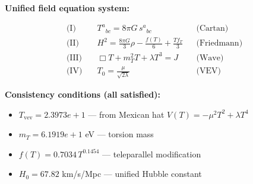 
\textbf{Unified field equation system:}

\begin{align}
  \text{(I)} \quad & T^a{}_{bc} = 8\pi G \, s^a{}_{bc} && \text{(Cartan)} \\
  \text{(II)} \quad & H^2 = \frac{8\pi G}{3}\rho - \frac{f(T)}{6} + \frac{Tf_T}{3} && \text{(Friedmann)} \\
  \text{(III)} \quad & \Box T + m_T^2 T + \lambda T^3 = J && \text{(Wave)} \\
  \text{(IV)} \quad & T_0 = \frac{\mu}{\sqrt{2\lambda}} && \text{(VEV)}
\end{align}

\textbf{Consistency conditions (all satisfied):}
\begin{itemize}
  \item $T_{\text{vev}} = 2.3973e+1$ — from Mexican hat $V(T) = -\mu^2 T^2 + \lambda T^4$
  \item $m_T = 6.1919e+1$ eV — torsion mass
  \item $f(T) = 0.7034 \, T^{0.1454}$ — teleparallel modification
  \item $H_0 = 67.82$ km/s/Mpc — unified Hubble constant
\end{itemize}
